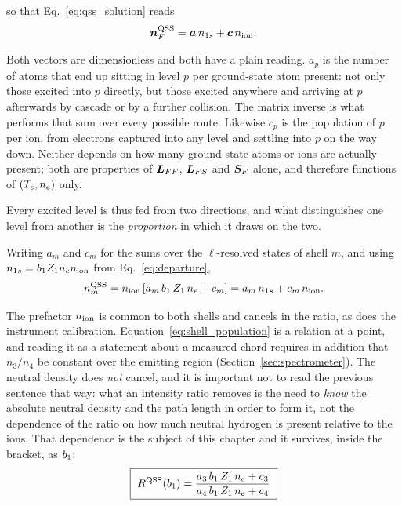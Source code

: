 \noindent so that Eq.~\eqref{eq:qss_solution} reads
\begin{equation}
  \bm{n}_{F}^{\mathrm{QSS}} = \bm{a}\,n_{1s} + \bm{c}\,n_{\mathrm{ion}} .
  \label{eq:two_supplies}
\end{equation}

Both vectors are dimensionless and both have a plain reading. $a_p$ is the
number of atoms that end up sitting in level $p$ per ground-state atom present:
not only those excited into $p$ directly, but those excited anywhere and
arriving at $p$ afterwards by cascade or by a further collision. The matrix
inverse is what performs that sum over every possible route. Likewise $c_p$ is
the population of $p$ per ion, from electrons captured into any level and
settling into $p$ on the way down. Neither depends on how many ground-state
atoms or ions are actually present; both are properties of $\bm{L}_{FF}$,
$\bm{L}_{FS}$ and $\bm{S}_F$ alone, and therefore functions of $(T_e,n_e)$ only.

Every excited level is thus fed from two directions, and what distinguishes one
level from another is the \emph{proportion} in which it draws on the two.

Writing $a_m$ and $c_m$ for the sums over the $\ell$-resolved states of shell
$m$, and using $n_{1s} = b_1Z_{1}n_en_{\mathrm{ion}}$ from Eq.~\eqref{eq:departure},
\begin{equation}
  n_m^{\mathrm{QSS}}
  = n_{\mathrm{ion}}\left[a_m\,b_1\,Z_{1}\,n_e + c_m\right]
  = a_m\,n_{1s} + c_m\,n_{\mathrm{ion}} .
  \label{eq:shell_population}
\end{equation}

\noindent The prefactor $n_{\mathrm{ion}}$ is common to both shells and cancels in the
ratio, as does the instrument calibration. Equation~\eqref{eq:shell_population}
is a relation at a point, and reading it as a statement about a measured chord
requires in addition that $n_3/n_4$ be constant over the emitting region
(Section~\ref{sec:spectrometer}). The neutral density does \emph{not}
cancel, and it is important not to read the previous sentence that way: what an
intensity ratio removes is the need to \emph{know} the absolute neutral density
and the path length in order to form it, not the dependence of the ratio on how
much neutral hydrogen is present relative to the ions. That dependence is the
subject of this chapter and it survives, inside the bracket, as $b_1$:
\begin{equation}
  \boxed{\
  R^{\mathrm{QSS}}(b_1) = \frac{a_3\,b_1\,Z_{1}\,n_e + c_3}
                      {a_4\,b_1\,Z_{1}\,n_e + c_4}\ }
  \label{eq:R_of_b}
\end{equation}

